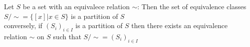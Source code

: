 \documentclass{article}
\begin{document}
    \begin{theorem}
        Let $S$ be a set with an equivalece relation $\sim$: Then the set of equivalence classes $S / \sim = \{[x] | x \in S\}$ is a partition of $S$
        \\ 
        conversely, if $(S_i)_{i \in I}$ is a partition of $S$ then there exists an equivalence relation $\sim$ on $S$ such that $S / \sim = (S_i)_{i \in I}$
    \end{theorem}
\end{document}
